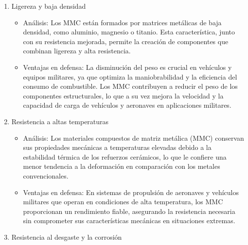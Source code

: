 \documentclass[letterpaper, 12pt]{article}
\begin{document}
\begin{enumerate}
      \item Ligereza y baja densidad

            \begin{itemize}
                  \item Análisis: Los MMC están formados por matrices metálicas de baja densidad, como
                        aluminio, magnesio o titanio. Esta característica, junto con su resistencia
                        mejorada, permite la creación de componentes que combinan ligereza y alta
                        resistencia.

                  \item Ventajas en defensa: La disminución del peso es crucial en vehículos y equipos
                        militares, ya que optimiza la maniobrabilidad y la eficiencia del consumo de
                        combustible. Los MMC contribuyen a reducir el peso de los componentes
                        estructurales, lo que a su vez mejora la velocidad y la capacidad de carga de
                        vehículos y aeronaves en aplicaciones militares.
            \end{itemize}

      \item Resistencia a altas temperaturas

            \begin{itemize}
                  \item       Análisis: Los materiales compuestos de matriz metálica (MMC) conservan sus
                        propiedades mecánicas a temperaturas elevadas debido a la estabilidad térmica
                        de los refuerzos cerámicos, lo que le confiere una menor tendencia a la
                        deformación en comparación con los metales convencionales.
                  \item Ventajas en defensa: En sistemas de propulsión de aeronaves y vehículos
                        militares que operan en condiciones de alta temperatura, los MMC proporcionan
                        un rendimiento fiable, asegurando la resistencia necesaria sin comprometer sus
                        características mecánicas en situaciones extremas.
            \end{itemize}

      \item Resistencia al desgaste y la corrosión


\end{enumerate}
\end{document}

